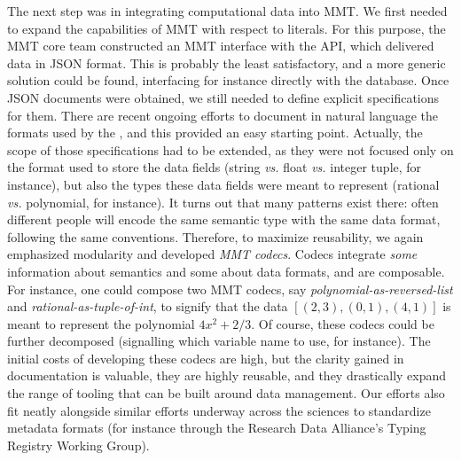 The next step was in integrating computational data into MMT. We first needed to expand the capabilities of MMT with respect to literals. For this purpose, the MMT core team constructed an MMT interface with the \LMFDB API, which delivered data in JSON format. This is probably the least satisfactory, and a more generic solution could be found, interfacing for instance directly with the \Mongo database. 
Once JSON  documents were obtained, we still needed to define explicit specifications for them. There are recent ongoing efforts \cite{lmfdb-formats} to document in natural language the formats used by the \LMFDB, and this provided an easy starting point. Actually, the scope of those specifications had to be extended, as they were not focused only on the format used to store the data fields (string \emph{vs.} float \emph{vs.} integer tuple, for instance), but also the types these data fields were meant to represent (rational \emph{vs.} polynomial, for instance). It turns out that many patterns exist there: often different people will encode the same semantic type with the same data format, following the same conventions. Therefore, to maximize reusability, we again emphasized modularity and developed \emph{MMT codecs}. Codecs integrate \emph{some} information about semantics and some about data formats, and are composable. For instance,  one could compose two MMT codecs, say \emph{polynomial-as-reversed-list} and \emph{rational-as-tuple-of-int}, to signify that the data $[(2,3),(0,1),(4,1)]$ is meant to represent the polynomial $4x^2+2/3$. Of course, these codecs could be further decomposed (signalling which variable name to use, for instance). The initial costs of developing these codecs are high, but the clarity gained in documentation is valuable, they are highly reusable, and they drastically expand the range of tooling that can be built around data management. Our efforts also fit neatly alongside similar efforts underway across the sciences to standardize metadata formats (for instance through the Research Data Alliance's Typing Registry Working Group\cite{rda-typing}). 

